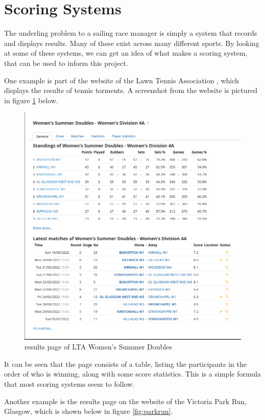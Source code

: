\documentclass{l4proj}
\begin{document}
\section{Scoring Systems}
The underling problem to a sailing race manager is simply a system that records and displays results. Many of these exist across many different sports. By looking at some of these systems, we can get an idea of what makes a scoring system, that can be used to inform this project.

One example is part of the website of the Lawn Tennis Association \citep{Tennis}, which displays the results of tennis torments. A screenshot from the website is pictured in figure \ref{fig:Tennis} below.

\begin{figure}[H]
    \centering
    \includegraphics[width=0.6\linewidth]{images/Tennis systme.png} 

    \caption{results page of LTA Women's Summer Doubles \citep{Tennis}
    }

    \label{fig:Tennis} 
\end{figure}

It can be seen that the page consists of a table, listing the participants in the order of who is winning, along with some score statistics. This is a simple formula that most scoring systems seem to follow.

Another example is the results page on the website of the Victoria Park Run, Glasgow, which is shown below in figure \ref{fig:parkrun}.
\end{document}

